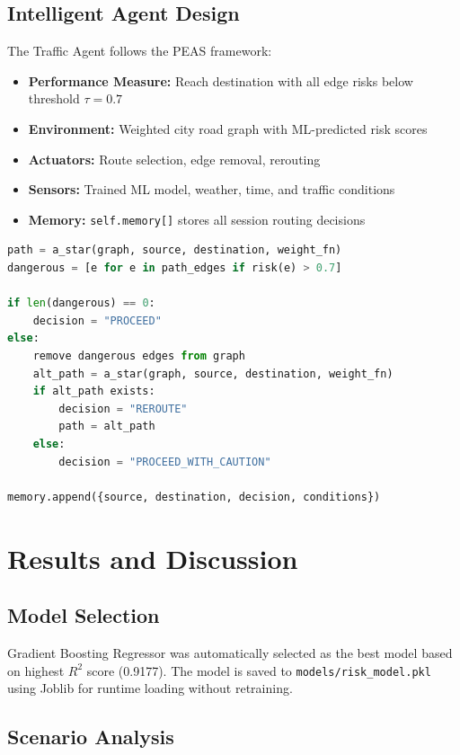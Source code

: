 \documentclass[12pt,a4paper]{report}
\begin{document}
\section{Intelligent Agent Design}
The Traffic Agent follows the PEAS framework:
\begin{itemize}
  \item \textbf{Performance Measure:} Reach destination with all edge risks below threshold $\tau = 0.7$
  \item \textbf{Environment:} Weighted city road graph with ML-predicted risk scores
  \item \textbf{Actuators:} Route selection, edge removal, rerouting
  \item \textbf{Sensors:} Trained ML model, weather, time, and traffic conditions
  \item \textbf{Memory:} \texttt{self.memory[]} stores all session routing decisions
\end{itemize}

\begin{lstlisting}[language=Python, caption=Agent Decision Algorithm]
path = a_star(graph, source, destination, weight_fn)
dangerous = [e for e in path_edges if risk(e) > 0.7]

if len(dangerous) == 0:
    decision = "PROCEED"
else:
    remove dangerous edges from graph
    alt_path = a_star(graph, source, destination, weight_fn)
    if alt_path exists:
        decision = "REROUTE"
        path = alt_path
    else:
        decision = "PROCEED_WITH_CAUTION"

memory.append({source, destination, decision, conditions})
\end{lstlisting}

\chapter{Results and Discussion}

\section{Model Selection}
Gradient Boosting Regressor was automatically selected as the best model based on highest $R^2$ score (0.9177). The model is saved to \texttt{models/risk\_model.pkl} using Joblib for runtime loading without retraining.

\section{Scenario Analysis}
\end{document}
